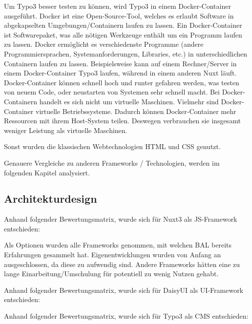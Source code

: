 Um Typo3 besser testen zu können, wird Typo3 in einem Docker-Container ausgeführt. Docker ist eine Open-Source-Tool, welches es erlaubt Software in abgekapselten Umgebungen/Containern laufen zu lassen. Ein Docker-Container ist Softwarepaket, was alle nötigen Werkzeuge enthält um ein Programm laufen zu lassen. Docker ermöglicht es verschiedenste Programme (andere Programmiersprachen, Systemanforderungen, Libraries, etc.) in unterschiedlichen Containern laufen zu lassen. Beispielsweise kann auf einem Rechner/Server in einem Docker-Container Typo3 laufen, während in einem anderen Nuxt läuft. Docker-Container können schnell hoch und runter gefahren werden, was testen von neuem Code, oder neustarten von Systemen sehr schnell macht. Bei Docker-Containern handelt es sich nicht um virtuelle Maschinen. Vielmehr sind Docker-Container virtuelle Betriebssysteme. Dadurch können Docker-Container mehr Ressourcen mit ihrem Host-System teilen. Deswegen verbrauchen sie insgesamt weniger Leistung als virtuelle Maschinen.


Sonst wurden die klassischen Webtechnologien HTML und CSS genutzt.

Genauere Vergleiche zu anderen Frameworks / Technologien, werden im folgenden Kapitel analysiert.


\subsection{Architekturdesign}
\label{sec:Architekturdesign}

Anhand folgender Bewertungsmatrix, wurde sich für Nuxt3 als JS-Framework entschieden:


Als Optionen wurden alle Frameworks genommen, mit welchen \acs{BAL} bereits Erfahrungen gesammelt hat. Eigenentwicklungen wurden von Anfang an ausgeschlossen, da diese zu aufwendig sind. Andere Frameworks hätten eine zu lange Einarbeitung/Umschulung für potentiell zu wenig Nutzen gehabt.

Anhand folgender Bewertungsmatrix, wurde sich für DaisyUI als UI-Framework entschieden:


Anhand folgender Bewertungsmatrix, wurde sich für Typo3 als CMS entschieden:


